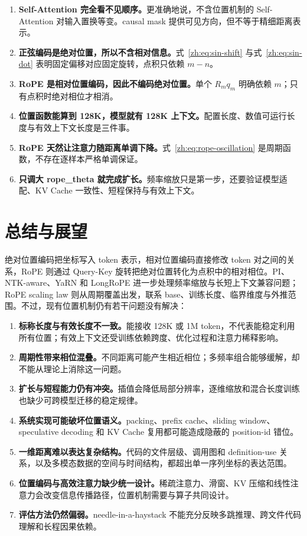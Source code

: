 \documentclass[UTF8,fontset=none,a4paper,10pt]{ctexart}
\begin{document}
\begin{enumerate}
  \item \textbf{Self-Attention 完全看不见顺序。}更准确地说，不含位置机制的 Self-Attention 对输入置换等变。causal mask 提供可见方向，但不等于精细距离表示。
  \item \textbf{正弦编码是绝对位置，所以不含相对信息。}式~\eqref{zh:eq:sin-shift} 与式~\eqref{zh:eq:sin-dot} 表明固定偏移对应固定旋转，点积只依赖 $m-n$。
  \item \textbf{RoPE 是相对位置编码，因此不编码绝对位置。}单个 $R_mq_m$ 明确依赖 $m$；只有点积时绝对相位才相消。
  \item \textbf{位置函数能算到 128K，模型就有 128K 上下文。}配置长度、数值可运行长度与有效上下文长度是三件事。
  \item \textbf{RoPE 天然让注意力随距离单调下降。}式~\eqref{zh:eq:rope-oscillation} 是周期函数，不存在逐样本严格单调保证。
  \item \textbf{只调大 \textnormal{rope\_theta} 就完成扩长。}频率缩放只是第一步，还要验证模型适配、KV Cache 一致性、短程保持与有效上下文。
\end{enumerate}

\section{总结与展望}

绝对位置编码把坐标写入 token 表示，相对位置编码直接修改 token 对之间的关系，RoPE 则通过 Query-Key 旋转把绝对位置转化为点积中的相对相位。PI、NTK-aware、YaRN 和 LongRoPE 进一步处理频率缩放与长短上下文兼容问题；RoPE scaling law 则从周期覆盖出发，联系 base、训练长度、临界维度与外推范围。不过，现有位置机制仍有若干问题没有解决：

\begin{enumerate}
  \item \textbf{标称长度与有效长度不一致。}能接收 128K 或 1M token，不代表能稳定利用所有位置；有效上下文还受训练依赖跨度、优化过程和注意力稀释影响。
  \item \textbf{周期性带来相位混叠。}不同距离可能产生相近相位；多频率组合能够缓解，却不能从理论上消除这一问题。
  \item \textbf{扩长与短程能力仍有冲突。}插值会降低局部分辨率，逐维缩放和混合长度训练也缺少可跨模型迁移的稳定规律。
  \item \textbf{系统实现可能破坏位置语义。}packing、prefix cache、sliding window、speculative decoding 和 KV Cache 复用都可能造成隐蔽的 position-id 错位。
  \item \textbf{一维距离难以表达复杂结构。}代码的文件层级、调用图和 definition-use 关系，以及多模态数据的空间与时间结构，都超出单一序列坐标的表达范围。
  \item \textbf{位置编码与高效注意力缺少统一设计。}稀疏注意力、滑窗、KV 压缩和线性注意力会改变信息传播路径，位置机制需要与算子共同设计。
  \item \textbf{评估方法仍然偏弱。}needle-in-a-haystack 不能充分反映多跳推理、跨文件代码理解和长程因果依赖。
\end{enumerate}
\end{document}
